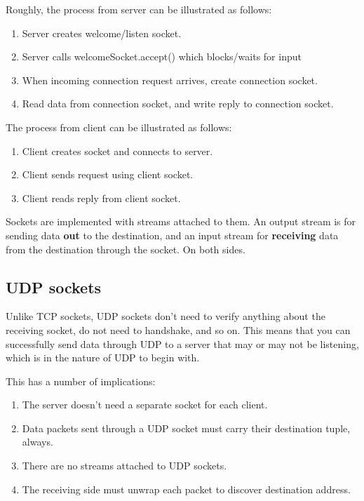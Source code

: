 Roughly, the process from server can be illustrated as follows:

\begin{enumerate}
    \item Server creates welcome/listen socket.
    \item Server calls welcomeSocket.accept() which blocks/waits for input
    \item When incoming connection request arrives, create connection socket.
    \item Read data from connection socket, and write reply to connection socket.
\end{enumerate}

The process from client can be illustrated as follows:

\begin{enumerate}
    \item Client creates socket and connects to server.
    \item Client sends request using client socket.
    \item Client reads reply from client socket.
\end{enumerate}

Sockets are implemented with streams attached to them. An output stream is for
sending data \textbf{out} to the destination, and an input stream for \textbf{receiving}
data from the destination through the socket. On both sides.

\subsection{UDP sockets}
Unlike TCP sockets, UDP sockets don't need to verify anything about the receiving
socket, do not need to handshake, and so on. This means that you can successfully
send data through UDP to a server that may or may not be listening, which is in
the nature of UDP to begin with.

This has a number of implications:
\begin{enumerate}
    \item The server doesn't need a separate socket for each client.
    \item Data packets sent through a UDP socket must carry their destination
        tuple, always.
    \item There are no streams attached to UDP sockets.
    \item The receiving side must unwrap each packet to discover destination
        address.
\end{enumerate}

